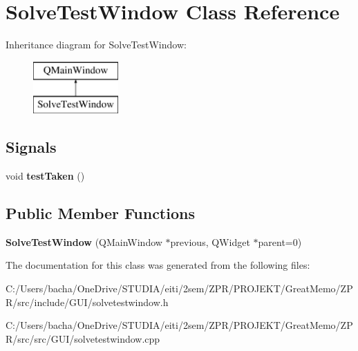 \hypertarget{class_solve_test_window}{}\section{Solve\+Test\+Window Class Reference}
\label{class_solve_test_window}
Inheritance diagram for Solve\+Test\+Window\+:\begin{figure}[H]
\begin{center}
\leavevmode
\includegraphics[height=2.000000cm]{class_solve_test_window}
\end{center}
\end{figure}
\subsection*{Signals}
\begin{DoxyCompactItemize}
\item 
\mbox{\label{class_solve_test_window_a06a0f747e4e238a73fbb82d2b76faf1d}} 
void {\bfseries test\+Taken} ()
\end{DoxyCompactItemize}
\subsection*{Public Member Functions}
\begin{DoxyCompactItemize}
\item 
\mbox{\label{class_solve_test_window_ad45c56b300aadcbdf5a960891a3b1be6}} 
{\bfseries Solve\+Test\+Window} (Q\+Main\+Window $\ast$previous, Q\+Widget $\ast$parent=0)
\end{DoxyCompactItemize}


The documentation for this class was generated from the following files\+:\begin{DoxyCompactItemize}
\item 
C\+:/\+Users/bacha/\+One\+Drive/\+S\+T\+U\+D\+I\+A/eiti/2sem/\+Z\+P\+R/\+P\+R\+O\+J\+E\+K\+T/\+Great\+Memo/\+Z\+P\+R/src/include/\+G\+U\+I/solvetestwindow.\+h\item 
C\+:/\+Users/bacha/\+One\+Drive/\+S\+T\+U\+D\+I\+A/eiti/2sem/\+Z\+P\+R/\+P\+R\+O\+J\+E\+K\+T/\+Great\+Memo/\+Z\+P\+R/src/src/\+G\+U\+I/solvetestwindow.\+cpp\end{DoxyCompactItemize}
